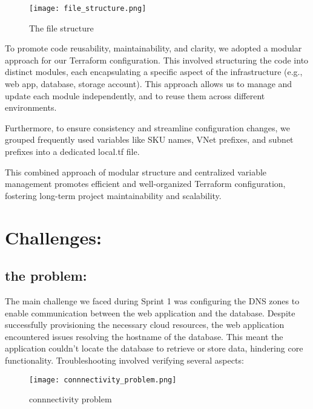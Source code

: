 \begin{figure}[htpb]
    \centering
    \texttt{[image: file\_structure.png]}
    \caption{The file structure}
    \label{fig:file_structure}
\end{figure}
To promote code reusability, maintainability, and clarity, we adopted a modular approach for our Terraform configuration. This involved structuring the code into distinct modules, each encapsulating a specific aspect of the infrastructure (e.g., web app, database, storage account). This approach allows us to manage and update each module independently, and to reuse them across different environments.
\par
Furthermore, to ensure consistency and streamline configuration changes, we grouped frequently used variables like SKU names, VNet prefixes, and subnet prefixes into a dedicated local.tf file.
\par
This combined approach of modular structure and centralized variable management promotes efficient and well-organized Terraform configuration, fostering long-term project maintainability and scalability.
\section{Challenges:}
\subsection*{the problem:}
The main challenge we faced during Sprint 1 was configuring the DNS zones to enable communication between the web application and the database. Despite successfully provisioning the necessary cloud resources, the web application encountered issues resolving the hostname of the database. This meant the application couldn't locate the database to retrieve or store data, hindering core functionality. Troubleshooting involved verifying several aspects:

\begin{figure}[htpb]
    \centering
    \texttt{[image: connnectivity\_problem.png]}
    \caption{connnectivity problem}
    \label{fig:connection_problem}
\end{figure}

